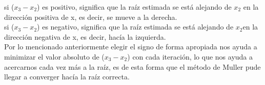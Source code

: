 \documentclass{article}
\begin{document}
\begin{enumerate}
si ($x_3 -x_2$) es positivo, significa que la raíz estimada se está alejando de $x_2$ en la dirección positiva de x, es decir, se mueve a la derecha.\\
si ($x_3 -x_2$) es negativo, significa que la raíz estimada se está alejando de $x_2$en la dirección negativa de x, es decir,  hacía la izquierda.\\
Por lo mencionado anteriormente elegir el signo de forma apropiada nos ayuda a minimizar el valor absoluto de ($x_3 -x_2$) con cada iteración, lo que nos ayuda a acercarnos cada vez más a la raíz, es de esta forma que el método de Muller pude llegar a converger hacía la raíz correcta. \\




\end{enumerate}
\end{document}
